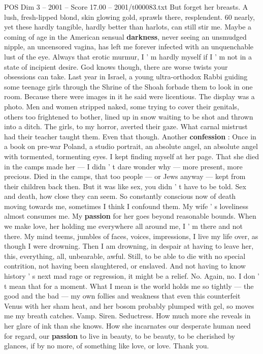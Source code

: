 \begin{textsample}{POS Dim 3 – 2001 – Score 17.00 – 2001/t000083.txt}
But forget her breasts.
A lush, fresh-lipped blond, skin glowing gold, sprawls there, resplendent. 60 nearly, yet these hardly tangible, hardly better than harlots, can still stir me.
Maybe a coming of age in the American sensual \textbf{darkness}, never seeing an unsmudged nipple, an uncensored vagina, has left me forever infected with an unquenchable lust of the eye.
Always that erotic murmur, I ' m hardly myself if I ' m not in a state of incipient desire.
God knows though, there are worse twists your obsessions can take.
Last year in Israel, a young ultra-orthodox Rabbi guiding some teenage girls through the Shrine of the Shoah forbade them to look in one room.
Because there were images in it he said were licentious.
The display was a photo.
Men and women stripped naked, some trying to cover their genitals, others too frightened to bother, lined up in snow waiting to be shot and thrown into a ditch.
The girls, to my horror, averted their gaze.
What carnal mistrust had their teacher taught them.
Even that though.
Another \textbf{confession} : Once in a book on pre-war Poland, a studio portrait, an absolute angel, an absolute angel with tormented, tormenting eyes.
I kept finding myself at her page.
That she died in the camps made her — I didn ' t dare wonder why — more present, more precious.
Died in the camps, that too people — or Jews anyway — kept from their children back then.
But it was like sex, you didn ' t have to be told.
Sex and death, how close they can seem.
So constantly conscious now of death moving towards me, sometimes I think I confound them.
My wife ' s loveliness almost consumes me.
My \textbf{passion} for her goes beyond reasonable bounds.
When we make love, her holding me everywhere all around me, I ' m there and not there.
My mind teems, jumbles of faces, voices, impressions, I live my life over, as though I were drowning.
Then I am drowning, in despair at having to leave her, this, everything, all, unbearable, awful.
Still, to be able to die with no special contrition, not having been slaughtered, or enslaved.
And not having to know history ' s next mad rage or regression, it might be a relief.
No.
Again, no.
I don ' t mean that for a moment.
What I mean is the world holds me so tightly — the good and the bad — my own follies and weakness that even this counterfeit Venus with her sham heat, and her bosom probably plumped with gel, so moves me my breath catches.
Vamp.
Siren.
Seductress.
How much more she reveals in her glare of ink than she knows.
How she incarnates our desperate human need for regard, our \textbf{passion} to live in beauty, to be beauty, to be cherished by glances, if by no more, of something like love, or love.
Thank you.

\end{textsample}
